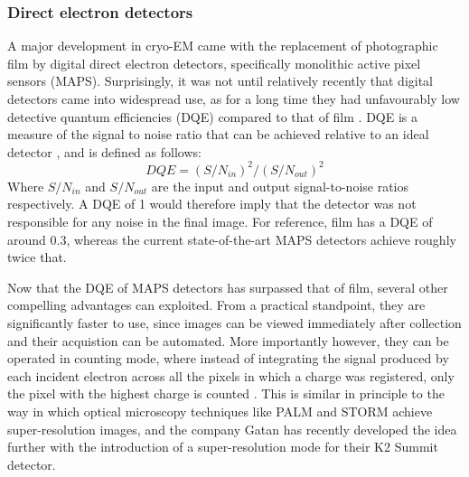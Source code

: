 \documentclass[a4paper,11pt,twoside,openright]{scrbook}
\let\cite\supercite
\begin{document}
\subsubsection{Direct electron detectors}
A major development in cryo-EM came with the replacement of photographic film by digital direct electron detectors, specifically monolithic active pixel sensors (MAPS). Surprisingly, it was not until relatively recently that digital detectors came into widespread use, as for a long time they had unfavourably low detective quantum efficiencies (DQE) compared to that of film \cite{McMullan2009}. DQE is a measure of the signal to noise ratio that can be achieved relative to an ideal detector \cite{Dainty1975}, and is defined as follows:
\begin{displaymath}
    DQE = (S/N_{in})^{2}/(S/N_{out})^{2}
\end{displaymath}
Where \begin{math} S/N_{in} \end{math} and \begin{math} S/N_{out} \end{math} are the input and output signal-to-noise ratios respectively. A DQE of 1 would therefore imply that the detector was not responsible for any noise in the final image. For reference, film has a DQE of around 0.3, whereas the current state-of-the-art MAPS detectors achieve roughly twice that.

Now that the DQE of MAPS detectors has surpassed that of film, several other compelling advantages can exploited. From a practical standpoint, they are significantly faster to use, since images can be viewed immediately after collection and their acquistion can be automated. More importantly however, they can be operated in counting mode, where instead of integrating the signal produced by each incident electron across all the pixels in which a charge was registered, only the pixel with the highest charge is counted \cite{McMullan2009a}. This is similar in principle to the way in which optical microscopy techniques like PALM \cite{Betzig2006} and STORM \cite{Rust2006} achieve super-resolution images, and the company Gatan has recently developed the idea further with the introduction of a super-resolution mode for their K2 Summit detector.
\end{document}
